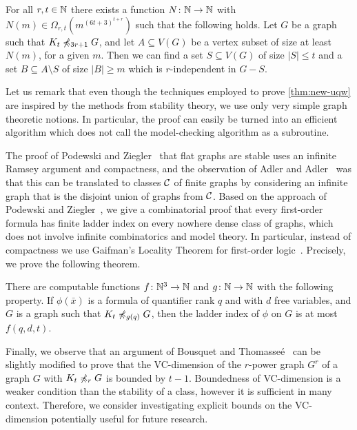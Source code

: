 \begin{theorem}\label{thm:new-uqw}
For all $r,t\in \mathbb{N}$ there exists a function $N\colon \mathbb{N}\to \mathbb{N}$ with $N(m)\in \Omega_{r,t}(m^{(6t+3)^{t+r}})$ such that the following holds.
Let $G$ be a graph such that $K_t\not\preccurlyeq_{3r+1} G$, and
let $A\subseteq V(G)$ be a vertex subset of size at least $N(m)$, for a given $m$.
Then we can find a set $S\subseteq V(G)$ of size $|S|\leq t$ and a set $B\subseteq A\setminus S$ 
of size $|B|\geq m$ which is $r$-independent in $G-S$.  
\end{theorem}

Let us remark
that even though the techniques employed to prove \cref{thm:new-uqw} are inspired by the methods from stability theory, 
we use only very simple graph theoretic notions. In particular, the
proof can easily be turned into an efficient algorithm which does not
call the model-checking algorithm as a subroutine. 

The proof of Podewski and Ziegler~\cite{podewski1978stable} that flat graphs are stable uses an 
infinite Ramsey argument and compactness, and the observation of Adler and Adler~\cite{adler2014interpreting} was that
this can be translated to classes $\mathcal{C}$ of finite graphs by considering an infinite graph that is the disjoint union of graphs from $\mathcal{C}$.
Based on the approach of Podewski and Ziegler~\cite{podewski1978stable}, we give a combinatorial 
proof that every first-order formula has finite ladder index on every
nowhere dense class of graphs, which does not involve infinite combinatorics and model theory.
In particular, instead of compactness we use Gaifman's Locality Theorem for
first-order logic~\cite{gaifman1982local}. Precisely, we prove the following theorem.

\begin{theorem}\label{thm:new-stable}
  There are computable functions $f\colon \mathbb{N}^3\to\mathbb{N}$ and $g\colon\mathbb{N}\to\mathbb{N}$ with the following property.
If $\phi(\bar x)$ is a formula of quantifier rank $q$ and with $d$ free variables,
and  $G$ is a graph such that $K_t\not\preccurlyeq_{g(q)} G$, then the ladder index of $\phi$ on $G$ is at most $f(q,d,t)$. 
\end{theorem}

Finally, we observe that an argument of Bousquet and 
Thomasse\'e~\cite{BousquetT15} can be slightly modified to prove that 
the VC-dimension of the $r$-power graph $G^r$ of a graph $G$
with $K_t\not\preccurlyeq_r G$ is bounded by $t-1$.
Boundedness of VC-dimension is a weaker condition than the stability of a class, however it is sufficient in many context.
Therefore, we consider investigating explicit bounds on the VC-dimension potentially useful for future research.

